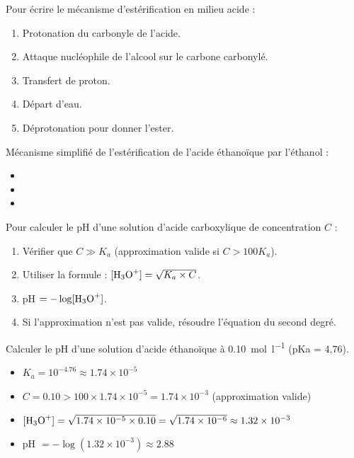 Pour écrire le mécanisme d'estérification en milieu acide :
\begin{enumerate}
    \item Protonation du carbonyle de l'acide.
    \item Attaque nucléophile de l'alcool sur le carbone carbonylé.
    \item Transfert de proton.
    \item Départ d'eau.
    \item Déprotonation pour donner l'ester.
\end{enumerate}

\begin{exemple}
Mécanisme simplifié de l'estérification de l'acide éthanoïque par l'éthanol :
\begin{itemize}
    \item {}
    \item {}
    \item {}
\end{itemize}
\end{exemple}

Pour calculer le pH d'une solution d'acide carboxylique de concentration $C$ :
\begin{enumerate}
    \item Vérifier que $C \gg K_a$ (approximation valide si $C > 100 K_a$).
    \item Utiliser la formule : $[\ce{H3O+}] = \sqrt{K_a \times C}$.
    \item pH $= -\log[\ce{H3O+}]$.
    \item Si l'approximation n'est pas valide, résoudre l'équation du second degré.
\end{enumerate}

\begin{exemple}
Calculer le pH d'une solution d'acide éthanoïque à \SI{0.10}{\mol\per\litre} (pKa = 4,76).
\begin{itemize}
    \item $K_a = 10^{-4.76} \approx 1.74 \times 10^{-5}$
    \item $C = 0.10 > 100 \times 1.74 \times 10^{-5} = 1.74 \times 10^{-3}$ (approximation valide)
    \item $[\ce{H3O+}] = \sqrt{1.74 \times 10^{-5} \times 0.10} = \sqrt{1.74 \times 10^{-6}} \approx 1.32 \times 10^{-3}$
    \item pH $= -\log(1.32 \times 10^{-3}) \approx 2.88$
\end{itemize}
\end{exemple}